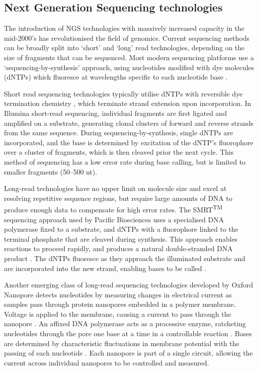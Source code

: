 \subsection{Next Generation Sequencing technologies}
The introduction of NGS technologies with massively increased capacity in the mid-2000’s has revolutionised the field of genomics. Current sequencing methods can be broadly split into ‘short’ and ‘long’ read technologies, depending on the size of fragments that can be sequenced. Most modern sequencing platforms use a ‘sequencing-by-synthesis’ approach, using nucleotides modified with dye molecules (dNTPs) which fluoresce at wavelengths specific to each nucleotide base \citep{Eid2009-gt,Bentley2008-xb}.\par
Short read sequencing technologies typically utilise dNTPs with reversible dye termination chemistry \citep{Bentley2008-xb,Croucher2009-iw}, which terminate strand extension upon incorporation. In Illumina short-read sequencing, individual fragments are first ligated and amplified on a substrate, generating clonal clusters of forward and reverse strands from the same sequence. During sequencing-by-synthesis, single dNTPs are incorporated, and the base is determined by excitation of the dNTP's fluorophore over a cluster of fragments, which is then cleaved prior the next cycle. This method of sequencing has a low error rate during base calling, but is limited to smaller fragments (50--500 nt). \par
Long-read technologies have no upper limit on molecule size and excel at resolving repetitive sequence regions, but require large amounts of DNA to produce enough data to compensate for high error rates. The SMRT\textsuperscript{TM} sequencing approach used by Pacific Biosciences uses a specialised DNA polymerase fixed to a substrate, and dNTPs with a fluorophore linked to the terminal phosphate that are cleaved during synthesis. This approach enables reactions to proceed rapidly, and produces a natural double-stranded DNA product \citep{Korlach2010-dj}. The dNTPs fluoresce as they approach the illuminated substrate and are incorporated into the new strand, enabling bases to be called \citep{Eid2009-gt}.\par
Another emerging class of long-read sequencing technologies developed by Oxford Nanopore detects nucleotides by measuring changes in electrical current as samples pass through protein nanopores embedded in a polymer membrane. Voltage is applied to the membrane, causing a current to pass through the nanopore \citep{Jain2016-hk,Feng2015-ut}. An affixed  DNA polymerase acts as a processive enzyme, ratcheting nucleotides through the pore one base at a time in a controllable reaction \citep{Cherf2012-jh}. Bases are determined by characteristic fluctuations in membrane potential with the passing of each nucleotide \citep{Stoddart2009-bo}. Each nanopore is part of a single circuit, allowing the current across individual nanopores to be controlled and measured.\par

